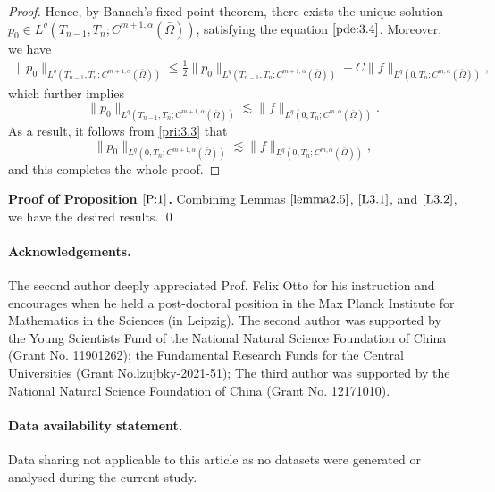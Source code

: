 \documentclass[13pt,CJK]{article}
\theoremstyle{plain}                       %
\theoremstyle{remark}
\numberwithin{equation}{section}
\begin{document}
\begin{proof}
\medskip

Hence, by Banach's fixed-point theorem, there exists the unique solution
$p_0\in L^q(T_{n-1},T_n;C^{m+1,\alpha}(\bar\Omega))$, satisfying the equation
$\eqref{pde:3.4}$.  Moreover, we have
\begin{equation*}
\begin{aligned}
\|p_0\|_{L^q(T_{n-1},T_n;C^{m+1,\alpha}(\bar\Omega))}
\leq
\frac{1}{2}\|p_0\|_{L^q(T_{n-1},T_n; C^{m+1,\alpha}(\bar\Omega))}
+ C\|f\|_{L^q(0,T_n; C^{m,\alpha}(\bar\Omega))},
\end{aligned}
\end{equation*}
which further implies
\begin{equation*}
\|p_0\|_{L^q(T_{n-1},T_n;C^{m+1,\alpha}(\bar\Omega))}
\lesssim
\|f\|_{L^q(0,T_{n};C^{m,\alpha}(\bar\Omega))}.
\end{equation*}
As a result, it follows from \eqref{pri:3.3} that
\begin{equation*}
\|p_0\|_{L^q(0,T_n;C^{m+1,\alpha}(\bar\Omega))}
\lesssim
\|f\|_{L^q(0,T_n;C^{m,\alpha}(\bar\Omega))},
\end{equation*}
and this completes the whole proof.
\end{proof}







\noindent
\textbf{Proof of Proposition $\ref{P:1}$.} Combining Lemmas $\ref{lemma2.5}$, $\ref{L3.1}$, and $\ref{L3.2}$, we have the desired results.
\qed




\paragraph{Acknowledgements.}
The second author deeply appreciated Prof. Felix Otto for his instruction and encourages when he held a post-doctoral position in the Max Planck Institute for Mathematics in the Sciences (in Leipzig).
The second author was supported by the Young Scientists Fund of the National Natural Science Foundation of China (Grant No. 11901262); the Fundamental Research Funds for the Central Universities (Grant No.lzujbky-2021-51);
The third author was supported by the National Natural Science Foundation of China (Grant No. 12171010).


\paragraph{Data availability statement.}
 Data sharing not applicable to this article as no datasets were generated or analysed during the current study.
 
\end{document}

